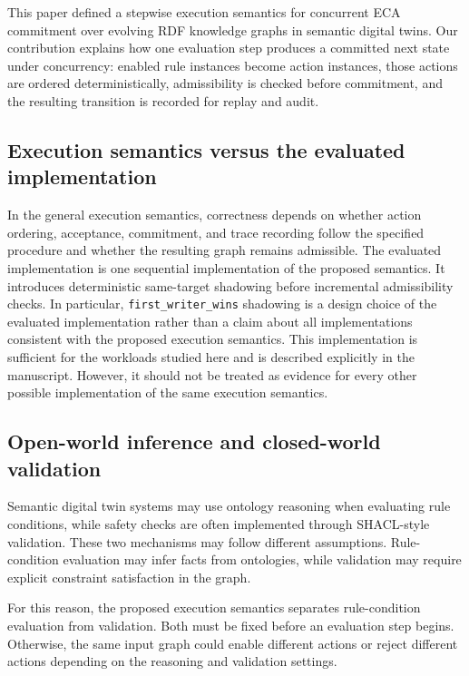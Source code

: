 \documentclass{ieeeaccess}
\theoremstyle{definition}
\theoremstyle{plain}
\theoremstyle{remark}
\begin{document}
This paper defined a stepwise execution semantics for concurrent ECA commitment over evolving RDF knowledge graphs in semantic digital twins. Our contribution explains how one evaluation step produces a committed next state under concurrency: enabled rule instances become action instances, those actions are ordered deterministically, admissibility is checked before commitment, and the resulting transition is recorded for replay and audit.

\subsection{Execution semantics versus the evaluated implementation}

In the general execution semantics, correctness depends on whether action ordering, acceptance, commitment, and trace recording follow the specified procedure and whether the resulting graph remains admissible. The evaluated implementation is one sequential implementation of the proposed semantics. It introduces deterministic same-target shadowing before incremental admissibility checks. In particular, \texttt{first\_writer\_wins} shadowing is a design choice of the evaluated implementation rather than a claim about all implementations consistent with the proposed execution semantics. This implementation is sufficient for the workloads studied here and is described explicitly in the manuscript. However, it should not be treated as evidence for every other possible implementation of the same execution semantics.

\subsection{Open-world inference and closed-world validation}

Semantic digital twin systems may use ontology reasoning when evaluating rule conditions, while safety checks are often implemented through SHACL-style validation. These two mechanisms may follow different assumptions. Rule-condition evaluation may infer facts from ontologies, while validation may require explicit constraint satisfaction in the graph.

For this reason, the proposed execution semantics separates rule-condition evaluation from validation. Both must be fixed before an evaluation step begins. Otherwise, the same input graph could enable different actions or reject different actions depending on the reasoning and validation settings.
\end{document}
